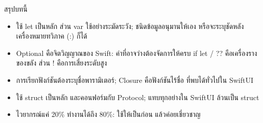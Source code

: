 \begin{tcbsummary}{สรุปบทนี้}
\begin{itemize}
  \item ใช้ let เป็นหลัก ส่วน var ใช้อย่างระมัดระวัง; ชนิดข้อมูลอนุมานให้เอง หรือจะระบุชัดหลังเครื่องหมายทวิภาค (:) ก็ได้
  \item Optional คือจิตวิญญาณของ Swift: ค่าที่อาจว่างต้องจัดการให้ครบ if let / ?? คือเครื่องรางของขลัง ส่วน ! คือการเสี่ยงระดับสูง
  \item การเรียกฟังก์ชันต้องระบุชื่อพารามิเตอร์; Closure คือฟังก์ชันไร้ชื่อ ที่พบได้ทั่วไปใน SwiftUI
  \item ใช้ struct เป็นหลัก และคอนฟอร์มกับ Protocol; แทบทุกอย่างใน SwiftUI ล้วนเป็น struct
  \item ไวยากรณ์แค่ 20\% ทำงานได้ถึง 80\%: ใช้ให้เป็นก่อน แล้วค่อยเชี่ยวชาญ
\end{itemize}

\end{tcbsummary}
